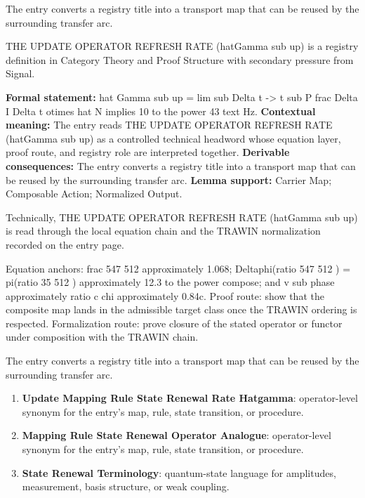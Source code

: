 The entry converts a registry title into a transport map that can be reused by the surrounding transfer arc.
\clearpage


\begingroup\small
{}
THE UPDATE OPERATOR REFRESH RATE (hatGamma sub up) is a registry definition in Category Theory and Proof Structure with secondary pressure from Signal.

\begingroup\footnotesize\setlength{\emergencystretch}{3em}\sloppy
\textbf{Formal statement:} hat Gamma sub up = lim sub Delta t -> t sub P frac Delta I Delta t otimes hat N implies 10 to the power 43 text Hz. \textbf{Contextual meaning:} The entry reads THE UPDATE OPERATOR REFRESH RATE (hatGamma sub up) as a controlled technical headword whose equation layer, proof route, and registry role are interpreted together. \textbf{Derivable consequences:} The entry converts a registry title into a transport map that can be reused by the surrounding transfer arc. \textbf{Lemma support:} Carrier Map; Composable Action; Normalized Output.\par
\endgroup

Technically, THE UPDATE OPERATOR REFRESH RATE (hatGamma sub up) is read through the local equation chain and the TRAWIN normalization recorded on the entry page.

Equation anchors: frac 547 512 approximately 1.068; Deltaphi(ratio 547 512 ) = pi(ratio 35 512 ) approximately 12.3 to the power compose; and v sub phase approximately ratio c chi approximately 0.84c. Proof route: show that the composite map lands in the admissible target class once the TRAWIN ordering is respected. Formalization route: prove closure of the stated operator or functor under composition with the TRAWIN chain.

The entry converts a registry title into a transport map that can be reused by the surrounding transfer arc.
\endgroup

\begin{enumerate}[leftmargin=1.6em,itemsep=6pt,topsep=4pt]
\item \textbf{Update Mapping Rule State Renewal Rate Hatgamma}: operator-level synonym for the entry's map, rule, state transition, or procedure.
\item \textbf{Mapping Rule State Renewal Operator Analogue}: operator-level synonym for the entry's map, rule, state transition, or procedure.
\item \textbf{State Renewal Terminology}: quantum-state language for amplitudes, measurement, basis structure, or weak coupling.
\end{enumerate}

